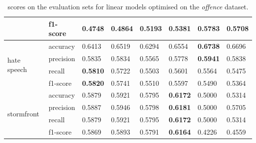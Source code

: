 \begin{table}[]
\begin{minipage}{0.42\paperheight}
{\begin{tabular}{ll|ll|ll|ll}
                                        & f1-score  & 0.4748      & 0.4864       & 0.5193 & 0.5381          & \bf{0.5783} & 0.5708      \\ \hline
      \multirow{4}{*}{hate speech}      & accuracy  & 0.6413      & 0.6519       & 0.6294 & 0.6554          & \bf{0.6738} & 0.6696      \\
                                        & precision & 0.5835      & 0.5834       & 0.5565 & 0.5778          & \bf{0.5941} & 0.5838      \\
                                        & recall    & \bf{0.5810} & 0.5722       & 0.5503 & 0.5601          & 0.5564      & 0.5475      \\
                                        & f1-score  & \bf{0.5820} & 0.5741       & 0.5510 & 0.5597          & 0.5490      & 0.5364      \\ \hline
      \multirow{4}{*}{stormfront}       & accuracy  & 0.5879      & 0.5921       & 0.5795 & \bf{0.6172}     & 0.5000      & 0.5314      \\
                                        & precision & 0.5887      & 0.5946       & 0.5798 & \bf{0.6181}     & 0.5000      & 0.5705      \\
                                        & recall    & 0.5879      & 0.5921       & 0.5795 & \bf{0.6172}     & 0.5000      & 0.5314      \\
                                        & f1-score  & 0.5869      & 0.5893       & 0.5791 & \bf{0.6164}     & 0.4226      & 0.4559
    \end{tabular}%
    }
    \caption{scores on the evaluation sets for linear models optimised on the \textit{offence} dataset.}
    \label{tab:linear_offence_baselines}
    \vfill
\end{minipage}
\end{table}
